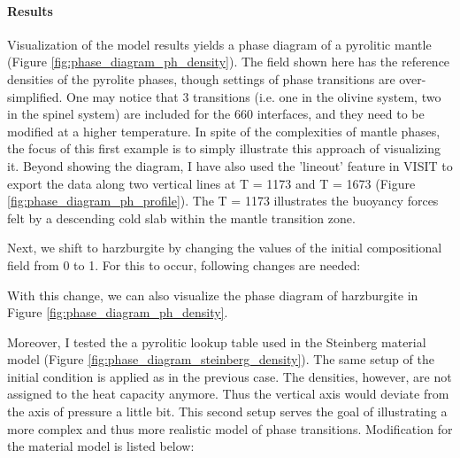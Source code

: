 \paragraph{Results}

\par Visualization of the model results yields a phase diagram of a pyrolitic mantle (Figure \ref{fig:phase_diagram_ph_density}). %
The field shown here has the reference densities of the pyrolite phases, though settings of phase transitions are over-simplified.
One may notice that 3 transitions (i.e. one in the olivine system, two in the spinel system) are included for the 660 interfaces, %
and they need to be modified at a higher temperature.
In spite of the complexities of mantle phases, the focus of this first example is to simply illustrate this approach of visualizing it.
Beyond showing the diagram, I have also used the 'lineout' feature in VISIT to export the data along two vertical lines at T = 1173 and T = 1673 (Figure \ref{fig:phase_diagram_ph_profile}). %
The T = 1173 illustrates the buoyancy forces felt by a descending cold slab within the mantle transition zone.

\par Next, we shift to harzburgite by changing the values of the initial compositional field from 0 to 1.  %
For this to occur, following changes are needed:

With this change, we can also visualize the phase diagram of harzburgite in Figure \ref{fig:phase_diagram_ph_density}.

\par Moreover, I tested the a pyrolitic lookup table used in the Steinberg material model (Figure \ref{fig:phase_diagram_steinberg_density}).%
The same setup of the initial condition is applied as in the previous case. %
The densities, however, are not assigned to the heat capacity anymore.
Thus the vertical axis would deviate from the axis of pressure a little bit.
This second setup serves the goal of illustrating a more complex and thus more realistic model of phase transitions.
Modification for the material model is listed below:


